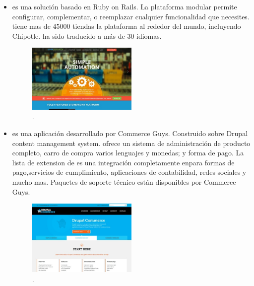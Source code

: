 \begin{itemize}
	\item \textbf{\nameSpreeCommerce} es una solución \ecommerce \opensource  basado en Ruby on Rails. La plataforma modular permite configurar, complementar, o reemplazar cualquier funcionalidad que necesites. \nameSpreeCommerce tiene mas de 45000 tiendas la plataforma al rededor del mundo, incluyendo Chipotle\cite{online_Chipotle}. \nameSpreeCommerce ha sido traducido a más de 30 idiomas.

	\begin{figure}[h!]
		\centering
		\includegraphics[width=0.5\textwidth]{figuras/cap1/SpreeCommerceWebsite.jpg}
		\caption{\nameSpreeCommerce \website\cite{online_SpreeCommerce}.}
	\end{figure}

	\item \textbf{\nameDrupalCommerce} es una aplicación \ecommerce desarrollado por Commerce Guys. Construido sobre Drupal content management system. \nameDrupalCommerce ofrece un sistema de administración de producto completo, carro de compra varios lenguajes y monedas; y forma de pago. La lista de extension de \nameDrupalCommerce es una integración completamente en\thirdParty para formas de pago,servicios de cumplimiento, aplicaciones de contabilidad, redes sociales y mucho mas. Paquetes de soporte técnico están disponibles por Commerce Guys.

	\begin{figure}[h!]
		\centering
		\includegraphics[width=0.5\textwidth]{figuras/cap1/DrupalCommerceWebsite.jpg}
		\caption{\nameDrupalCommerce \website\cite{online_DrupalCommerce}.}
	\end{figure}


\end{itemize}
